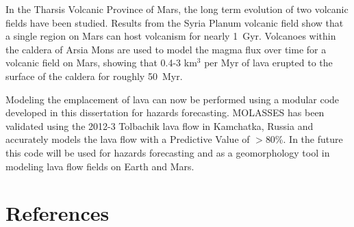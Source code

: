 In the Tharsis Volcanic Province of Mars, the long term evolution of two volcanic fields have been studied. Results from the Syria Planum volcanic field show that a single region on Mars can host volcanism for nearly 1~Gyr. Volcanoes within the caldera of Arsia Mons are used to model the magma flux over time for a volcanic field on Mars, showing that 0.4-3 km$^3$ per Myr of lava erupted to the surface of the caldera for roughly 50~Myr.

Modeling the emplacement of lava can now be performed using a modular code developed in this dissertation for hazards forecasting. MOLASSES has been validated using the 2012-3 Tolbachik lava flow in Kamchatka, Russia and accurately models the lava flow with a Predictive Value of $>$80\%. In the future this code will be used for hazards forecasting and as a geomorphology tool in modeling lava flow fields on Earth and Mars.

\singlespacing
\setlength{\bibsep}{3pt}

\section{References}


 

